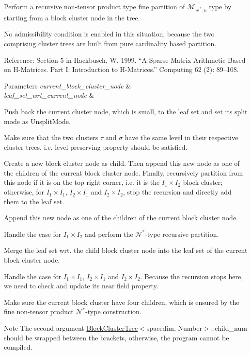 Perform a recursive non-\/tensor product type fine partition of $\mathcal{M}_{\mathcal{N}^*,k}$ type by starting from a block cluster node in the tree.

No admissibility condition is enabled in this situation, because the two comprising cluster trees are built from pure cardinality based partition.

Reference\+: Section 5 in Hackbusch, W. 1999. “A Sparse Matrix Arithmetic Based on H-\/\+Matrices. Part I\+: Introduction to H-\/\+Matrices.” Computing 62 (2)\+: 89–108. 
\begin{DoxyParams}{Parameters}
{\em current\+\_\+block\+\_\+cluster\+\_\+node} & \\
\hline
{\em leaf\+\_\+set\+\_\+wrt\+\_\+current\+\_\+node} & \\
\hline
\end{DoxyParams}
Push back the current cluster node, which is small, to the leaf set and set its split mode as {\ttfamily Unsplit\+Mode}.

Make sure that the two clusters $\tau$ and $\sigma$ have the same level in their respective cluster trees, i.\+e. level preserving property should be satisfied.

Create a new block cluster node as child. Then append this new node as one of the children of the current block cluster node. Finally, recursively partition from this node if it is on the top right corner, i.\+e. it is the $I_1 \times I_2$ block cluster; otherwise, for $I_1 \times I_1$, $I_2 \times I_1$ and $I_2 \times I_2$, stop the recursion and directly add them to the leaf set.

Append this new node as one of the children of the current block cluster node.

Handle the case for $I_1 \times I_2$ and perform the $\mathcal{N}^*$-\/type recursive partition.

Merge the leaf set wrt. the child block cluster node into the leaf set of the current block cluster node.

Handle the case for $I_1 \times I_1$, $I_2 \times I_1$ and $I_2 \times I_2$. Because the recursion stops here, we need to check and update its near field property.

Make sure the current block cluster have four children, which is ensured by the fine non-\/tensor product $\mathcal{N}^*$-\/type construction.


\begin{DoxyDescription}
\item[Note ]The second argument {\ttfamily \hyperlink{classBlockClusterTree}{Block\+Cluster\+Tree}$<$spacedim}, Number$>$\+::child\+\_\+num should be wrapped between the brackets, otherwise, the program cannot be compiled. 
\end{DoxyDescription}


